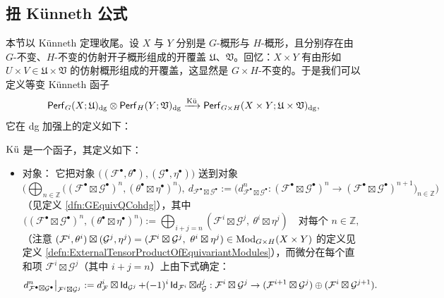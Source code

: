 \subsection{扭 Künneth 公式}

本节以 Künneth 定理收尾。设 $X$ 与 $Y$ 分别是 $G$-概形与 $H$-概形，且分别存在由 $G$-不变、$H$-不变的仿射开子概形组成的开覆盖 $\mathfrak{U}$、$\mathfrak{V}$。回忆：$X\times Y$ 有由形如 $U\times V\in\mathfrak{U}\times\mathfrak{V}$ 的仿射概形组成的开覆盖，这显然是 $G\times H$-不变的。于是我们可以定义等变 Künneth 函子
$$
\Perf_G(X;\mathfrak{U})_{\dg}
\otimes
\Perf_H(Y;\mathfrak{V})_{\dg}
\xrightarrow{\Ku}
\Perf_{G\times H}(X\times Y;\mathfrak{U}\times\mathfrak{V})_{\dg},
$$
它在 dg 加强上的定义如下：
\begin{defn}
$\Ku$ 是一个函子，其定义如下：
\begin{itemize}
\item
对象：
它把对象
$
\big((\mathcal{F}^{\bullet},\theta^{\bullet}),(\mathcal{G}^{\bullet},\eta^{\bullet})\big)
$
送到对象
$$
\Big(
\bigoplus_{n\in\mathbb{Z}}
\big(
(\mathcal{F}^{\bullet}\boxtimes\mathcal{G}^{\bullet})^n,
(\theta^{\bullet}\boxtimes\eta^{\bullet})^n
\big),
\
d_{\mathcal{F}^{\bullet}\boxtimes\mathcal{G}^{\bullet}}
:=
\big(
d_{\mathcal{F}^{\bullet}\boxtimes\mathcal{G}^{\bullet}}^n
:
(\mathcal{F}^{\bullet}\boxtimes\mathcal{G}^{\bullet})^n
\rightarrow
(\mathcal{F}^{\bullet}\boxtimes\mathcal{G}^{\bullet})^{n+1}
\big)_{n\in\mathbb{Z}}
\Big)
$$
（见定义 \ref{dfn:GEquivQCohdg}），其中
$$
\big(
(\mathcal{F}^{\bullet}\boxtimes\mathcal{G}^{\bullet})^n,
(\theta^{\bullet}\boxtimes\eta^{\bullet})^n
\big)
:=
\bigoplus_{i+j=n}
(
\mathcal{F}^i\boxtimes\mathcal{G}^j,
\
\theta^i\boxtimes\eta^j
)
\quad\text{对每个 }n\in\mathbb{Z},
$$
（注意 $
(\mathcal{F}^i,\theta^i)
\boxtimes
(\mathcal{G}^j,\eta^j)
=
(
\mathcal{F}^i\boxtimes\mathcal{G}^j,
\
\theta^i\boxtimes\eta^j
)
\in\Mod_{G\times H}(X\times Y)
$
的定义见定义 \ref{defn:ExternalTensorProductOfEquivariantModules}），而微分在每个直和项 $\mathcal{F}^i\boxtimes\mathcal{G}^j$（其中 $i+j=n$）上由下式确定：
\[
d_{\mathcal F^\bullet\boxtimes\mathcal G^\bullet}^n
\big|_{\mathcal F^i\boxtimes\mathcal G^j}
:=
d_{\mathcal F}^i\boxtimes\id_{\mathcal G^j}
+
(-1)^i\id_{\mathcal F^i}\boxtimes d_{\mathcal G}^j
:
\mathcal{F}^i\boxtimes\mathcal{G}^j
\rightarrow
(\mathcal{F}^{i+1}\boxtimes\mathcal{G}^j)
\oplus
(\mathcal{F}^i\boxtimes\mathcal{G}^{j+1}).
\]


\end{itemize}
\end{defn}
